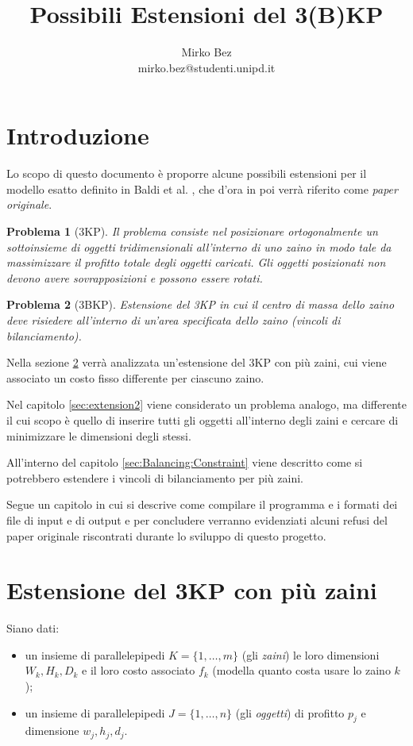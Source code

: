 \documentclass{scrartcl}
\title{Possibili Estensioni del 3(B)KP}
\author{Mirko Bez \\
	mirko.bez@studenti.unipd.it
	}
\newtheorem{problem}{Problema}
\begin{document}
\maketitle
\tableofcontents
\newpage
\section{Introduzione}
Lo scopo di questo documento è proporre alcune possibili estensioni per il modello esatto definito in Baldi et al. \cite{Baldi20129802}, che d'ora in poi verrà riferito come \emph{paper originale}.

\begin{problem}[3KP]
Il problema consiste nel posizionare ortogonalmente un sottoinsieme di oggetti tridimensionali all'interno di uno zaino in modo tale da massimizzare il profitto totale degli oggetti caricati. 
Gli oggetti posizionati non devono avere sovrapposizioni e possono essere rotati.
\end{problem}

\begin{problem}[3BKP]
	Estensione del 3KP in cui il centro di massa dello zaino deve risiedere all'interno di un'area specificata dello zaino (vincoli di bilanciamento).
\end{problem}



Nella sezione \ref{sec:extension1} verrà analizzata un'estensione del 3KP con più zaini, cui viene associato un costo fisso differente per ciascuno zaino.

Nel capitolo \ref{sec:extension2} viene considerato un problema analogo, ma differente il cui scopo è quello di inserire tutti gli oggetti all'interno degli zaini e cercare di minimizzare le dimensioni degli stessi. 

 All'interno del capitolo \ref{sec:Balancing:Constraint} viene descritto come si potrebbero estendere i vincoli di bilanciamento per più zaini. 


Segue un capitolo in cui si descrive come compilare il programma e i formati dei file di input e di output e per concludere verranno evidenziati alcuni refusi del paper originale riscontrati durante lo sviluppo di questo progetto.


\section{Estensione del 3KP con più zaini}
\label{sec:extension1}

Siano dati:
\begin{itemize} 
	
	\item un insieme di parallelepipedi $K = \{1, \dots, m \}$ (gli \emph{zaini}) le loro dimensioni $W_k, H_k, D_k$ e il loro costo associato $f_k$ (modella quanto costa usare lo zaino $k$);
	\item un insieme di parallelepipedi $J = \{1, \dots, n\}$ (gli \emph{oggetti}) di profitto $p_j$ e dimensione $w_j, h_j, d_j$.
\end{itemize}
\end{document}
